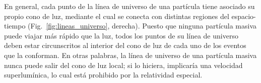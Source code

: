 En general, cada punto de la línea de universo de una partícula tiene asociado su propio cono de luz, mediante el cual se conecta con distintas regiones del espacio-tiempo (Fig.~\ref{fig:lineas_universo}, derecha). Puesto que ninguna partícula masiva puede viajar más rápido que la luz, todos los puntos de su línea de universo deben estar circunscritos al interior del cono de luz de cada uno de los eventos que la conforman. En otras palabras, la línea de universo de una partícula masiva nunca puede salir del cono de luz local; si lo hiciera, implicaría una velocidad superlumínica, lo cual está prohibido por la relatividad especial.

